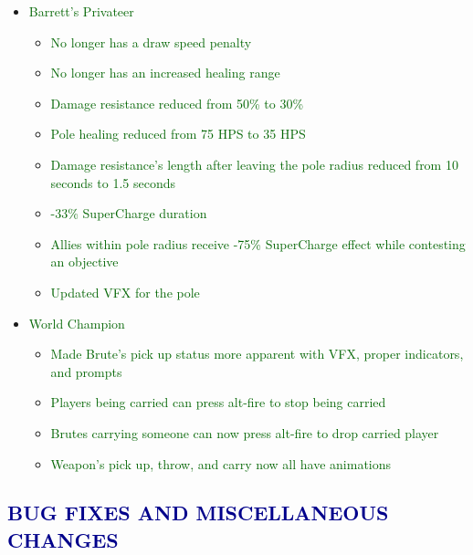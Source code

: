 \documentclass{article}
\begin{document}
\begin{itemize}
    \item \textcolor{darkgreen}{Barrett’s Privateer}
    \begin{itemize}
        \item \textcolor{darkgreen}{No longer has a draw speed penalty}
        \item \textcolor{darkgreen}{No longer has an increased healing range}
        \item \textcolor{darkgreen}{Damage resistance reduced from 50\% to 30\%}
        \item \textcolor{darkgreen}{Pole healing reduced from 75 HPS to 35 HPS}
        \item \textcolor{darkgreen}{Damage resistance’s length after leaving the pole radius reduced from 10 seconds to 1.5 seconds}
        \item \textcolor{darkgreen}{-33\% SuperCharge duration}
        \item \textcolor{darkgreen}{Allies within pole radius receive -75\% SuperCharge effect while contesting an objective}
        \item \textcolor{darkgreen}{Updated VFX for the pole}
    \end{itemize}
    \item \textcolor{darkgreen}{World Champion}
    \begin{itemize}
        \item \textcolor{darkgreen}{Made Brute’s pick up status more apparent with VFX, proper indicators, and prompts}
        \item \textcolor{darkgreen}{Players being carried can press alt-fire to stop being carried}
        \item \textcolor{darkgreen}{Brutes carrying someone can now press alt-fire to drop carried player}
        \item \textcolor{darkgreen}{Weapon’s pick up, throw, and carry now all have animations}
    \end{itemize}
\end{itemize}




\subsection*{\textcolor{darkblue}{BUG FIXES AND MISCELLANEOUS CHANGES}}
\end{document}
